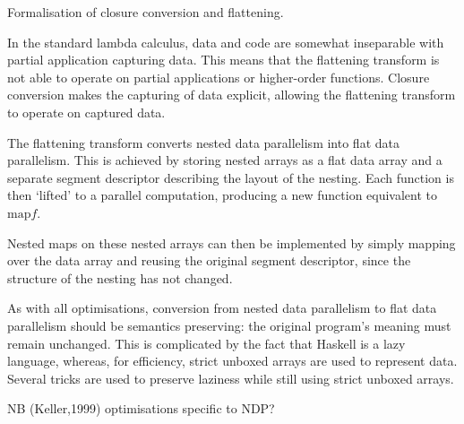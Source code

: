 

Formalisation of closure conversion and flattening. 

In the standard lambda calculus, data and code are somewhat inseparable with partial application capturing data.
This means that the flattening transform is not able to operate on partial applications or higher-order functions.
Closure conversion makes the capturing of data explicit, allowing the flattening transform to operate on captured data.

The flattening transform converts nested data parallelism into flat data parallelism.
This is achieved by storing nested arrays as a flat data array and a separate segment descriptor describing the layout of the nesting.
Each function is then `lifted' to a parallel computation, producing a new function equivalent to $\mbox{map} f$.

Nested maps on these nested arrays can then be implemented by simply mapping over the data array and reusing the original segment descriptor,
since the structure of the nesting has not changed.

As with all optimisations, conversion from nested data parallelism to flat data parallelism should be semantics preserving:
the original program's meaning must remain unchanged.
This is complicated by the fact that Haskell is a lazy language, whereas, for efficiency, strict unboxed arrays are used to represent data.
Several tricks are used to preserve laziness while still using strict unboxed arrays.



NB (Keller,1999) optimisations specific to NDP?


